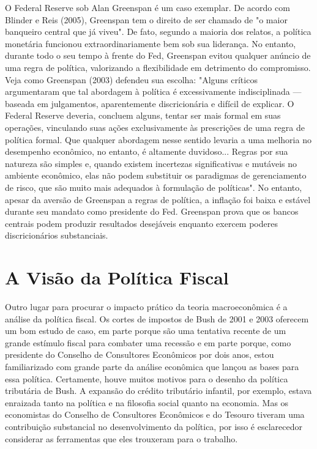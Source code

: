 \documentclass[12pt]{article}
\begin{document}
O Federal Reserve sob Alan Greenspan é um caso exemplar. De acordo com Blinder e Reis (2005), Greenspan tem o direito de ser chamado de "o maior banqueiro central que já viveu". De fato, segundo a maioria dos relatos, a política monetária funcionou extraordinariamente bem sob sua liderança. No entanto, durante todo o seu tempo à frente do Fed, Greenspan evitou qualquer anúncio de uma regra de política, valorizando a flexibilidade em detrimento do compromisso. Veja como Greenspan (2003) defendeu sua escolha: "Alguns críticos argumentaram que tal abordagem à política é excessivamente indisciplinada — baseada em julgamentos, aparentemente discricionária e difícil de explicar. O Federal Reserve deveria, concluem alguns, tentar ser mais formal em suas operações, vinculando suas ações exclusivamente às prescrições de uma regra de política formal. Que qualquer abordagem nesse sentido levaria a uma melhoria no desempenho econômico, no entanto, é altamente duvidoso... Regras por sua natureza são simples e, quando existem incertezas significativas e mutáveis no ambiente econômico, elas não podem substituir os paradigmas de gerenciamento de risco, que são muito mais adequados à formulação de políticas". No entanto, apesar da aversão de Greenspan a regras de política, a inflação foi baixa e estável durante seu mandato como presidente do Fed. Greenspan prova que os bancos centrais podem produzir resultados desejáveis enquanto exercem poderes discricionários substanciais.

\section{A Visão da Política Fiscal}

Outro lugar para procurar o impacto prático da teoria macroeconômica é a análise da política fiscal. Os cortes de impostos de Bush de 2001 e 2003 oferecem um bom estudo de caso, em parte porque são uma tentativa recente de um grande estímulo fiscal para combater uma recessão e em parte porque, como presidente do Conselho de Consultores Econômicos por dois anos, estou familiarizado com grande parte da análise econômica que lançou as bases para essa política. Certamente, houve muitos motivos para o desenho da política tributária de Bush. A expansão do crédito tributário infantil, por exemplo, estava enraizada tanto na política e na filosofia social quanto na economia. Mas os economistas do Conselho de Consultores Econômicos e do Tesouro tiveram uma contribuição substancial no desenvolvimento da política, por isso é esclarecedor considerar as ferramentas que eles trouxeram para o trabalho.
\end{document}
